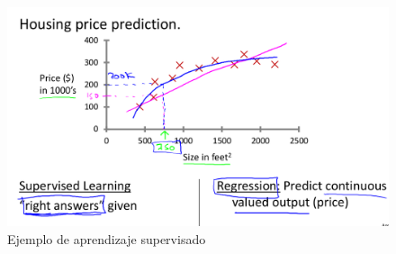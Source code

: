\documentclass{book}
\begin{document}
\begin{figure}
	\centering
	\includegraphics[scale=0.35]{img/Ej1}
	\caption{Ejemplo de aprendizaje supervisado}
	\label{fig:Ej1}
\end{figure}
\end{document}
